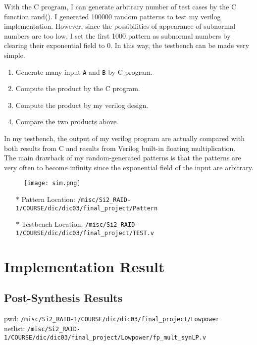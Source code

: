 \documentclass{article}
\begin{document}
        With the C program, I can generate arbitrary number of test cases by the C function rand().
        I generated 100000 random patterns to test my verilog implementation.
        However, since the possibilities of appearance of subnormal numbers are too low,
        I set the first 1000 pattern as subnormal numbers by clearing their exponential field to 0. 
        In this way, the testbench can be made very simple. 
        \begin{enumerate}
            \item Generate many input {\tt A} and {\tt B} by C program.
            \item Compute the product by the C program.
            \item Compute the product by my verilog design.
            \item Compare the two products above.
        \end{enumerate}

        In my testbench, the output of my verilog program are actually compared with both results from C and results from Verilog built-in floating multiplication. \\
        The main drawback of my random-generated patterns is that the patterns are very often to become infinity since the exponential field of the input are arbitrary.

        \begin{figure}[h]
            \texttt{[image: sim.png]}
        \end{figure}

        \begin{itemize}
            \item[$*$] Pattern Location: \verb|/misc/Si2_RAID-1/COURSE/dic/dic03/final_project/Pattern|
            \item[$*$] Testbench Location: \verb|/misc/Si2_RAID-1/COURSE/dic/dic03/final_project/TEST.v|
        \end{itemize}

        \newpage

    \section{Implementation Result}
        
        \subsection{Post-Synthesis Results}
            \noindent pwd: \verb|/misc/Si2_RAID-1/COURSE/dic/dic03/final_project/Lowpower| \\
            netlist: \verb|/misc/Si2_RAID-1/COURSE/dic/dic03/final_project/Lowpower/fp_mult_synLP.v|
            
\end{document}
